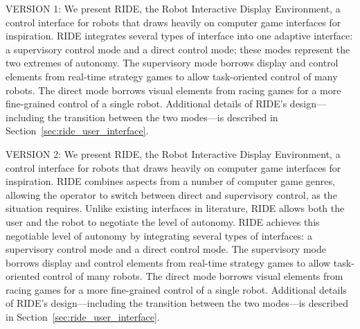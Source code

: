 



VERSION 1:
We present RIDE, the Robot Interactive Display Environment, a control interface for robots that draws heavily on computer game interfaces for inspiration. RIDE integrates several types of interface into one adaptive interface: a supervisory control mode and a direct control mode; these modes represent the two extremes of autonomy. The supervisory mode borrows display and control elements from real-time strategy games to allow task-oriented control of many robots. The direct mode borrows visual elements from racing games for a more fine-grained control of a single robot. Additional details of RIDE’s design—including the transition between the two modes—is described in Section~\ref{sec:ride_user_interface}.

VERSION 2:
We present RIDE, the Robot Interactive Display Environment, a control interface for robots that draws heavily on computer game interfaces for inspiration. RIDE combines aspects from a number of computer game genres, allowing the operator to switch between direct and supervisory control, as the situation requires. Unlike existing interfaces in literature, RIDE allows both the user and the robot to negotiate the level of autonomy. RIDE achieves this negotiable level of autonomy by integrating several types of interfaces: a supervisory control mode and a direct control mode. The supervisory mode borrows display and control elements from real-time strategy games to allow task-oriented control of many robots. The direct mode borrows visual elements from racing games for a more fine-grained control of a single robot. Additional details of RIDE’s design—including the transition between the two modes—is described in Section~\ref{sec:ride_user_interface}.

